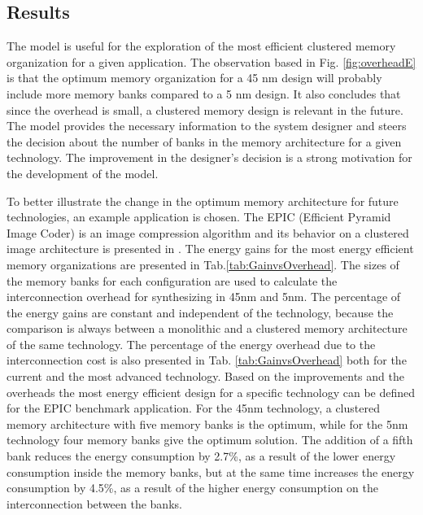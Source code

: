  
\subsection{Results}
 
The model is useful for the exploration of the most efficient clustered memory organization for a given application. 
The observation based in Fig. \ref{fig:overheadE} is that the optimum memory organization for a 45 nm design will probably include more memory banks compared to a 5 nm design.
It also concludes that since the overhead is small, a clustered memory design is relevant in the future.
The model provides the necessary information to the system designer and steers the decision about the number of banks in the memory architecture for a given technology.
The improvement in the designer's decision is a strong motivation for the development of the model. 

To better illustrate the change in the optimum memory architecture for future technologies, an example application is chosen.
The EPIC (Efficient Pyramid Image Coder)  is an image compression algorithm and its behavior on a clustered image architecture is presented in \cite{filippopoulos2013exploration}.
The energy gains for the most energy efficient memory organizations are presented in Tab.\ref{tab:GainvsOverhead}.
The sizes of the memory banks for each configuration are used to calculate the interconnection overhead for synthesizing in 45nm and 5nm.
The percentage of the energy gains are constant and independent of the technology, because the comparison is always between a monolithic and a clustered memory architecture of the same technology.
The percentage of the energy overhead due to the interconnection cost is also presented in Tab. \ref{tab:GainvsOverhead} both for the current and the most advanced technology.
Based on the improvements and the overheads the most energy efficient design for a specific technology can be defined for the EPIC benchmark application.
For the 45nm technology, a clustered memory architecture with five memory banks is the optimum, while for the 5nm technology four memory banks give the optimum solution.
The addition of a fifth bank reduces the energy consumption by 2.7\%, as a result of the lower energy consumption inside the memory banks, but at the same time increases the energy consumption by 4.5\%, as a result of the higher energy consumption on the interconnection between the banks.

